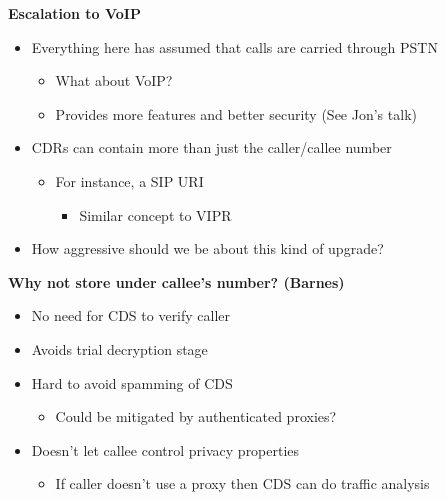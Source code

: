 \documentclass[helvetica]{seminar}
\newcommand{\heading}[1]{%
  \begin{center} 
    \large\bf 
    #1 
  \end{center} 
  \vspace{.4 in}}
\begin{document}
\begin{slide}
\heading{Escalation to VoIP}

\begin{itemize}
\item Everything here has assumed that calls are carried through PSTN
  \begin{itemize}
  \item What about VoIP?
  \item Provides more features and better security (See Jon's talk)
  \end{itemize}

\item CDRs can contain more than just the caller/callee number
  \begin{itemize}
  \item For instance, a SIP URI
    \begin{itemize}
    \item Similar concept to VIPR
    \end{itemize}
  \end{itemize}

\item How aggressive should we be about this kind of upgrade?
\end{itemize}
\end{slide}


\begin{slide}
\heading{Why not store under callee's number? (Barnes)}

\begin{itemize}
\item No need for CDS to verify caller
\item Avoids trial decryption stage
\item Hard to avoid spamming of CDS
  \begin{itemize}
  \item Could be mitigated by authenticated proxies?
  \end{itemize}

\item Doesn't let callee control privacy properties
  \begin{itemize}
  \item If caller doesn't use a proxy then CDS can do traffic analysis
  \end{itemize}
\end{itemize}
\end{slide}
\end{document}
